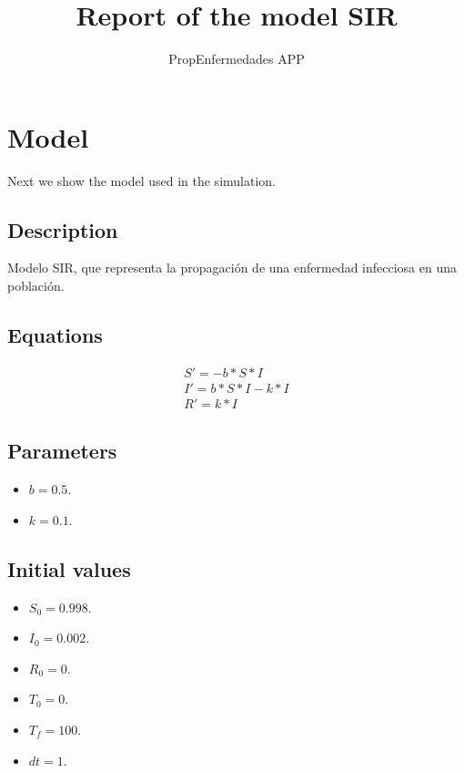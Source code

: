\documentclass{article}
\title{Report of the model SIR}
\author{PropEnfermedades APP}
\date{}
\begin{document}
\maketitle
\section{Model}
Next we show the model used in the simulation.
\subsection*{Description}
Modelo SIR, que representa la propagación de una enfermedad infecciosa en una población.
\subsection*{Equations}
\begin{equation}
\begin{split}
S' = -b * S * I \\ I' = b * S * I - k * I \\ R' = k * I
\end{split}
\end{equation}
\subsection*{Parameters}
\begin{itemize}
\item $b = 0.5$. 
\item $k = 0.1$. 
\end{itemize}
\subsection*{Initial values}
\begin{itemize}
\item $S_0 = 0.998$. 
\item $I_0 = 0.002$. 
\item $R_0 = 0$. 
\item $T_0 = 0$. 
\item $T_f = 100$. 
\item $dt = 1$. 
\end{itemize}
\end{document}
